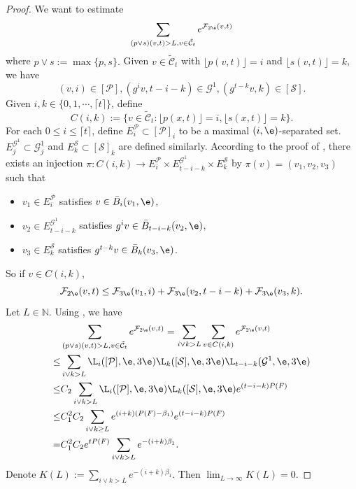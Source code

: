 \documentclass[11pt]{amsart}
\theoremstyle{definition}
\newcommand{\PPP}{\mathcal{P}}
\newcommand{\SSS}{\mathcal{S}}
\newcommand{\GGG}{\mathcal{G}}
\newcommand{\CC}{\mathbb{C}}
\def\P{{\mathcal P}}
\def\CC{{\mathcal C}}
\newcommand{\F}{\mathcal{F}}
\def\NN{{\mathbb N}}
\def\b{\beta}
\begin{document}
\begin{proof}
We want to estimate 
$$\sum_{(p\vee s)(v,t)>L, v\in \tilde\CC_t}e^{\F_{2\e}(v,t)}$$
where $p\vee s:=\max\{p,s\}.$ Given $v\in \tilde\CC_t$ with $\lfloor p(v,t)\rfloor =i$ and $\lfloor s(v,t)\rfloor =k$, we have
$$(v,i)\in [\PPP], (g^iv, t-i-k)\in \GGG^1, (g^{t-k}v,k)\in [\SSS].$$
Given $i,k\in \{0,1,\cdots, \lceil t\rceil\}$, define
$$C(i,k):=\{v\in \tilde\CC_t: \lfloor p(x,t)\rfloor =i, \lfloor s(x,t)\rfloor =k\}.$$
For each $0\le i \le \lceil t\rceil$, define $E_i^\P \subset [\P]_i$ to be a maximal $(i,\e)$-separated set. $E_j^{\GGG^1}\subset \GGG^1_j$ and $E_k^\SSS \subset [\SSS]_k$ are defined similarly. According to the proof of \cite[Lemma 4.8]{CT16}, there exists an injection $\pi: C(i,k)\to E_i^\P\times E_{t-i-k}^{\GGG^1}\times E_k^\SSS$
by $\pi(v)=(v_1, v_2,v_3)$ such that
\begin{itemize}
    \item $v_1\in E_i^\P$ satisfies $v\in \bar B_i(v_1,\e)$,
     \item $v_2\in E_{t-i-k}^{\GGG^1}$ satisfies $g^iv\in \bar B_{t-i-k}(v_2,\e)$,
     \item $v_3\in E_k^\SSS$ satisfies $g^{t-k}v\in \bar B_k(v_3,\e)$.
\end{itemize}
So if $v\in C(i,k)$, 
$$\F_{2\e}(v,t)\le \F_{3\e}(v_1, i)+\F_{3\e}(v_2, t-i-k)+\F_{3\e}(v_3, k).$$
Let $L\in \NN$. Using \cite[Proposition 4.7]{CT16}, we have
\begin{equation}\label{badsegment}
    \begin{aligned}
&\sum_{(p\vee s)(v,t)>L, v\in \tilde\CC_t}e^{\F_{2\e}(v,t)}= \sum_{i\vee k> L}\sum_{v\in C(i,k)}e^{\F_{2\e}(v,t)}\\
\le &\sum_{i\vee k> L}\L_i([\PPP],\e, 3\e)\L_k([\SSS],\e, 3\e)\L_{t-i-k}(\GGG^1,\e, 3\e)\\
\le &C_2\sum_{i\vee k> L}\L_i([\PPP],\e, 3\e)\L_k([\SSS],\e, 3\e)e^{(t-i-k)P(F)}\\
\le &C_1^2C_2\sum_{i\vee k\ge L}e^{(i+k)(P(F)-\b_1)}e^{(t-i-k)P(F)}\\
= &C_1^2C_2e^{tP(F)}\sum_{i\vee k> L}e^{-(i+k)\b_1}.
    \end{aligned}
\end{equation}
Denote $K(L):=\sum_{i\vee k> L}e^{-(i+k)\b_1}$. Then $\lim_{L\to \infty}K(L)=0$.


\end{proof}
\end{document}
